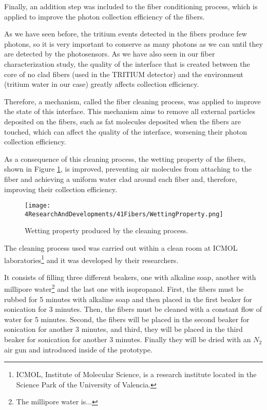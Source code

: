Finally, an addition step was included to the fiber conditioning process, which is applied to improve the photon collection efficiency of the fibers. 

As we have seen before, the tritium events detected in the fibers produce few photons, so it is very important to conserve as many photons as we can until they are detected by the photosensors. As we have also seen in our fiber characterization study, the quality of the interface that is created between the core of no clad fibers (used in the TRITIUM detector) and the environment (tritium water in our case) greatly affects collection efficiency.

Therefore, a mechanism, called the fiber cleaning process, was applied to improve the state of this interface. This mechanism aims to remove all external particles deposited on the fibers, such as fat molecules deposited when the fibers are touched, which can affect the quality of the interface, worsening their photon collection efficiency. 

As a consequence of this cleaning process, the wetting property of the fibers, shown in Figure \ref{fig:WettingProperty}, is improved, preventing air molecules from attaching to the fiber and achieving a uniform water clad around each fiber and, therefore, improving their collection efficiency. 


\begin{figure}[h]
\centering
\texttt{[image: 4ResearchAndDevelopments/41Fibers/WettingProperty.png]}
\caption{Wetting property produced by the cleaning process. \cite{}\label{fig:WettingProperty}}
\end{figure}


The cleaning process used was carried out within a clean room at ICMOL laboratories\footnote{ICMOL, Institute of Molecular Science, is a research institute located in the Science Park of the University of Valencia.} and it was developed by their researchers.

It consists of filling three different beakers, one with alkaline soap, another with millipore water\footnote{The millipore water is...} and the last one with isopropanol. First, the fibers must be rubbed for 5 minutes with alkaline soap and then placed in the first beaker for sonication for 3 minutes. Then, the fibers must be cleaned with a constant flow of water for 5 minutes. Second, the fibers will be placed in the second beaker for sonication for another 3 minutes, and third, they will be placed in the third beaker for sonication for another 3 minutes. Finally they will be dried with an $N_2$ air gun and introduced inside of the prototype.

